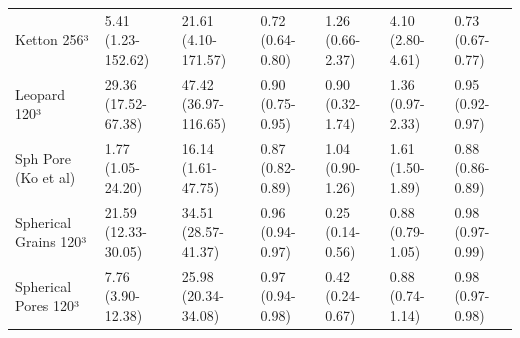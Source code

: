 \begin{tabular}{lllllll}
Ketton 256³ & 5.41 (1.23-152.62) & 21.61 (4.10-171.57) & 0.72 (0.64-0.80) & 1.26 (0.66-2.37) & 4.10 (2.80-4.61) & 0.73 (0.67-0.77) \\
Leopard 120³ & 29.36 (17.52-67.38) & 47.42 (36.97-116.65) & 0.90 (0.75-0.95) & 0.90 (0.32-1.74) & 1.36 (0.97-2.33) & 0.95 (0.92-0.97) \\
Sph Pore (Ko et al) & 1.77 (1.05-24.20) & 16.14 (1.61-47.75) & 0.87 (0.82-0.89) & 1.04 (0.90-1.26) & 1.61 (1.50-1.89) & 0.88 (0.86-0.89) \\
Spherical Grains 120³ & 21.59 (12.33-30.05) & 34.51 (28.57-41.37) & 0.96 (0.94-0.97) & 0.25 (0.14-0.56) & 0.88 (0.79-1.05) & 0.98 (0.97-0.99) \\
Spherical Pores 120³ & 7.76 (3.90-12.38) & 25.98 (20.34-34.08) & 0.97 (0.94-0.98) & 0.42 (0.24-0.67) & 0.88 (0.74-1.14) & 0.98 (0.97-0.98) \\
\bottomrule
\end{tabular}
